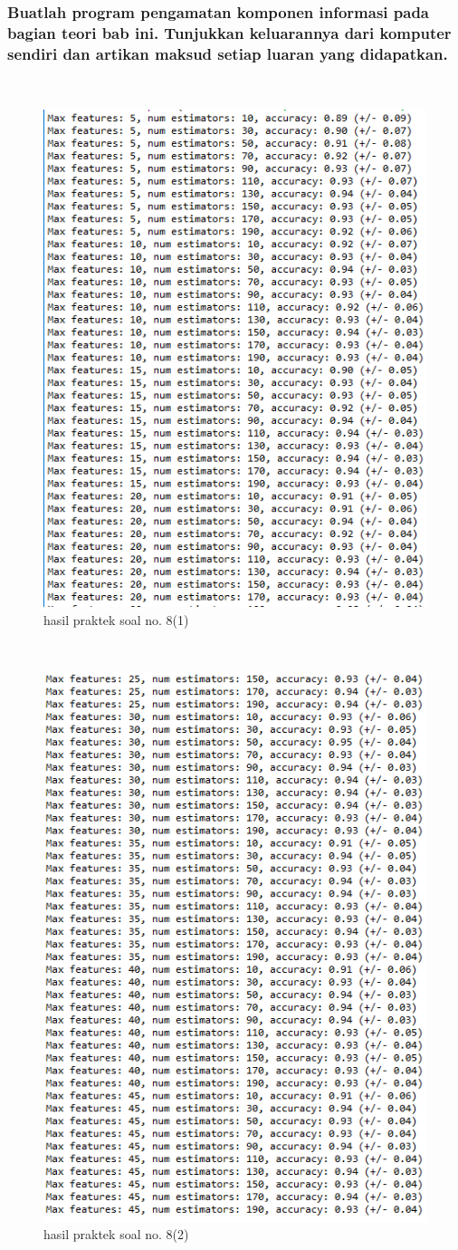 \subsubsection{Buatlah program pengamatan komponen informasi pada bagian teori bab ini. Tunjukkan keluarannya dari komputer sendiri dan artikan maksud setiap luaran yang didapatkan.}
\hfill\\

	\begin{figure}[H]
	\centering
		\includegraphics[width=8 cm]{figures/1174083/figures4/17.png}
	\caption{hasil praktek soal no. 8(1)}
	\end{figure}
	\hfill\\
	\begin{figure}[H]
	\centering
		\includegraphics[width=8 cm]{figures/1174083/figures4/18.png}
	\caption{hasil praktek soal no. 8(2)}
	\end{figure}
	
